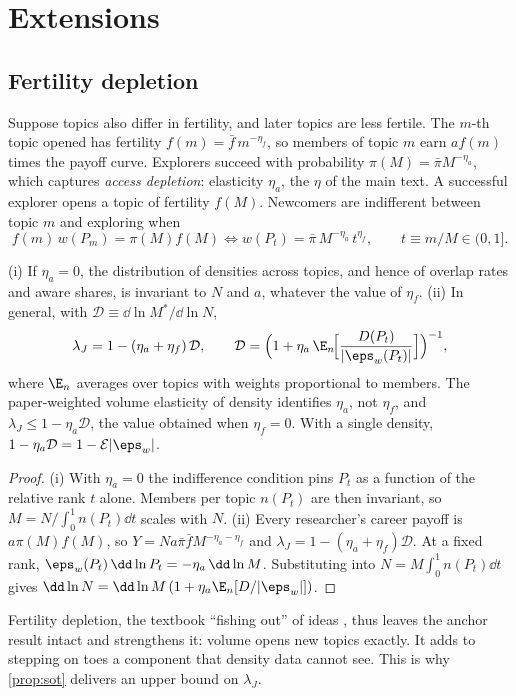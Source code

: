 \section{Extensions}\label{app:extensions}

\subsection{Fertility depletion}\label{app:fertility}

Suppose topics also differ in fertility, and later topics are less fertile.
The $m$-th topic opened has fertility $f(m)=\bar f\,m^{-\eta_f}$, so members of
topic $m$ earn $a f(m)$ times the payoff curve. Explorers succeed with
probability $\pi(M)=\bar\pi M^{-\eta_a}$, which captures \emph{access
depletion}: elasticity $\eta_a$, the $\eta$ of the main text. A successful
explorer opens a topic of fertility $f(M)$. Newcomers are indifferent between
topic $m$ and exploring when
\[
f(m)\,w(P_m)=\pi(M)f(M)\iff w(P_t)=\bar\pi\,M^{-\eta_a}\,t^{\eta_f},\qquad t\equiv m/M\in(0,1].
\]
\begin{proposition}
(i) If $\eta_a=0$, the distribution of densities across topics, and hence of
overlap rates and aware shares, is invariant to $N$ and $a$, whatever the value of
$\eta_f$. (ii) In general, with $\mathcal D\equiv\dd\ln M^*/\dd\ln N$,
\[
\lambda_J=1-(\eta_a+\eta_f)\,\mathcal D,\qquad
\mathcal D=\Big(1+\eta_a\,\E_n\!\Big[\frac{D(P_t)}{|\eps_w(P_t)|}\Big]\Big)^{-1},
\]
where $\E_n$ averages over topics with weights proportional to members. The
paper-weighted volume elasticity of density identifies $\eta_a$, not $\eta_f$, and
$\lambda_J\le1-\eta_a\mathcal D$, the value obtained when $\eta_f=0$. With a single
density, $1-\eta_a\mathcal D=1-\mathcal E|\eps_w|$.
\end{proposition}
\begin{proof}
(i) With $\eta_a=0$ the indifference condition pins $P_t$ as a function of the
relative rank $t$ alone. Members per topic $n(P_t)$ are then invariant, so
$M=N/\int_0^1n(P_t)\dd t$ scales with $N$. (ii) Every researcher's career payoff is
$a\pi(M)f(M)$, so $Y=Na\bar\pi\bar f M^{-\eta_a-\eta_f}$ and
$\lambda_J=1-(\eta_a+\eta_f)\mathcal D$. At a fixed rank, $\eps_w(P_t)\,\dd\ln
P_t=-\eta_a\,\dd\ln M$. Substituting into $N=M\int_0^1n(P_t)\dd t$ gives
$\dd\ln N=\dd\ln M\,(1+\eta_a\E_n[D/|\eps_w|])$.
\end{proof}

Fertility depletion, the textbook ``fishing out'' of ideas \citep{kortum1997}, thus
leaves the anchor result intact and strengthens it: volume opens new topics
exactly. It adds to stepping on toes a component that density data cannot
see. This is why \cref{prop:sot} delivers an upper bound on $\lambda_J$.

